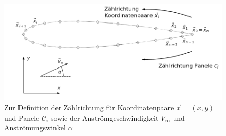 \begin{figure}
\begin{center} \includegraphics[scale=0.7]{figures/zaehlrichtung.png} \end{center}
\caption{Zur Definition der Zählrichtung für Koordinatenpaare $\vec x = (x,y)$ und Panele $\mathcal{C}_{i}$ sowie der Anströmgeschwindigkeit $V_{\infty}$ und Anströmungswinkel $\alpha$}
\label{fig:zaehlrichtung}
\end{figure}

